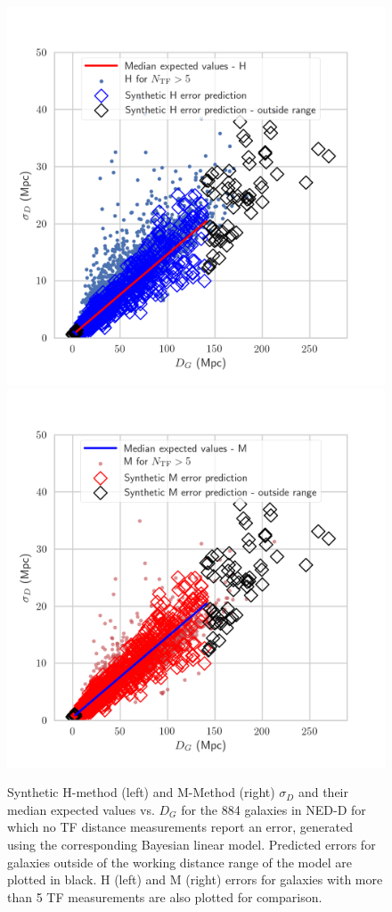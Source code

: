 \documentclass[a4paper,fleqn,usenatbib]{mnras}
\begin{document}
\begin{figure}
	\includegraphics[scale=0.69]{f22predl1.png}
	\includegraphics[scale=0.69]{f23predl2.png}
    \caption{Synthetic H-method (left) and M-Method (right) $\sigma_D$ and their median expected values vs. $D_G$ for the 884 galaxies in NED-D for which no TF distance measurements report an error, generated using the corresponding Bayesian linear model. Predicted errors for galaxies outside of the working distance range of the model are plotted in black. H (left) and M (right) errors for galaxies with more than 5 TF measurements are also plotted for comparison.}
    \label{fig:predl1}
\end{figure}
\end{document}
